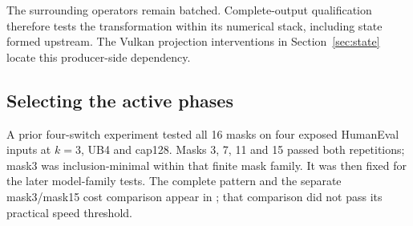 The surrounding operators remain batched. Complete-output qualification therefore tests the transformation within its numerical stack, including state formed upstream. The Vulkan projection interventions in Section~\ref{sec:state} locate this producer-side dependency.

\subsection{Selecting the active phases}
A prior four-switch experiment tested all 16 masks on four exposed HumanEval inputs at $k=3$, UB4 and cap128. Masks 3, 7, 11 and 15 passed both repetitions; mask3 was inclusion-minimal within that finite mask family. It was then fixed for the later model-family tests. The complete pattern and the separate mask3/mask15 cost comparison appear in ; that comparison did not pass its practical speed threshold.
